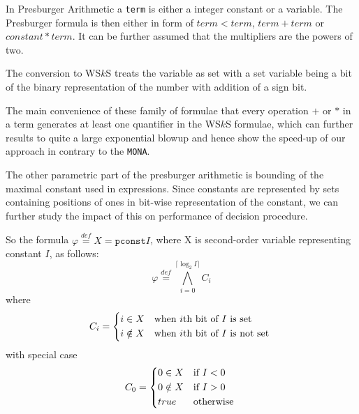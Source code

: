 In Presburger Arithmetic a \texttt{term} is either a integer constant or a
variable. The Presburger formula is then either in form of $term < term$, $term
+ term$ or $constant * term$. It can be further assumed that the multipliers
are the powers of two.

The conversion to WS$k$S treats the variable as set with a set variable being a
bit of the binary representation of the number with addition of a sign bit.

The main convenience of these family of formulae that every operation $+$ or $*$
in a term generates at least one quantifier in the WS$k$S formulae, which can
further results to quite a large exponential blowup and hence show the speed-up
of our approach in contrary to the \texttt{MONA}.

The other parametric part of the presburger arithmetic is bounding of the
maximal constant used in expressions. Since constants are represented by sets
containing positions of ones in bit-wise representation of the constant, we can
further study the impact of this on performance of decision procedure.

So the formula $\varphi \overset{\mathit{def}}{=} X = \mathtt{pconst}{I}$, where
X is second-order variable representing constant $I$, as follows:
\begin{equation}
 \varphi \overset{\mathit{def}}{=} \bigwedge_{i = 0}^{\lceil \log_2 I\rceil} C_i
\end{equation}
where
\begin{equation}
  C_i = \begin{dcases*}
         i \in X  & when $i$th bit of $I$ is set\\
         i \notin X & when $i$th bit of $I$ is not set
         \end{dcases*}
\end{equation}
with special case
\begin{equation}
  C_0 = \begin{dcases*}
          0 \in X  & if $I < 0$\\
         0 \notin X & if $I > 0$\\
         true & otherwise
         \end{dcases*}
\end{equation}


